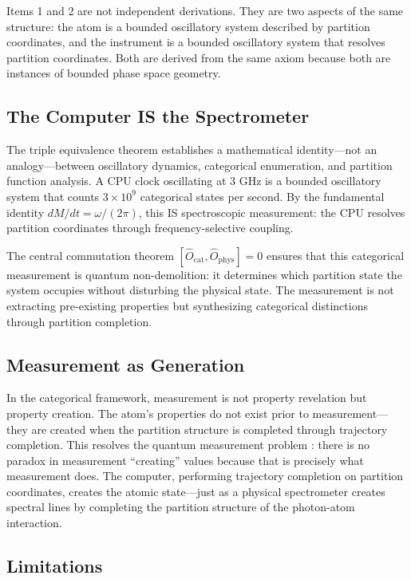 \documentclass[11pt,a4paper]{article}
\theoremstyle{definition}
\theoremstyle{remark}
\begin{document}
Items 1 and 2 are not independent derivations. They are two aspects of the same structure: the atom is a bounded oscillatory system described by partition coordinates, and the instrument is a bounded oscillatory system that resolves partition coordinates. Both are derived from the same axiom because both are instances of bounded phase space geometry.

\subsection{The Computer IS the Spectrometer}

The triple equivalence theorem establishes a mathematical identity---not an analogy---between oscillatory dynamics, categorical enumeration, and partition function analysis. A CPU clock oscillating at 3 GHz is a bounded oscillatory system that counts $3 \times 10^9$ categorical states per second. By the fundamental identity $dM/dt = \omega/(2\pi)$, this IS spectroscopic measurement: the CPU resolves partition coordinates through frequency-selective coupling.

The central commutation theorem $[\hat{O}_{\mathrm{cat}}, \hat{O}_{\mathrm{phys}}] = 0$ ensures that this categorical measurement is quantum non-demolition: it determines which partition state the system occupies without disturbing the physical state. The measurement is not extracting pre-existing properties but synthesizing categorical distinctions through partition completion.

\subsection{Measurement as Generation}

In the categorical framework, measurement is not property revelation but property creation. The atom's properties do not exist prior to measurement---they are created when the partition structure is completed through trajectory completion. This resolves the quantum measurement problem \citep{caves1980}: there is no paradox in measurement ``creating'' values because that is precisely what measurement does. The computer, performing trajectory completion on partition coordinates, creates the atomic state---just as a physical spectrometer creates spectral lines by completing the partition structure of the photon-atom interaction.

\subsection{Limitations}
\end{document}
